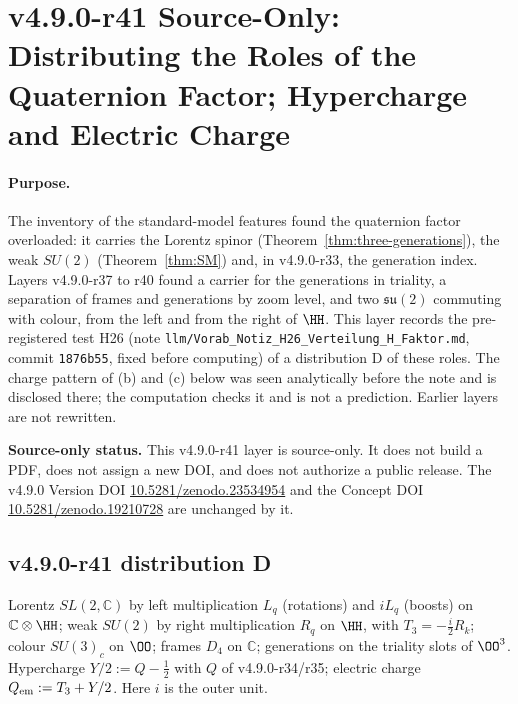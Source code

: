 \clearpage
\section*{v4.9.0-r41 Source-Only: Distributing the Roles of the Quaternion Factor; Hypercharge and Electric Charge}
\label{sec:v490-r41-quaternion-roles}

\paragraph{Purpose.}
The inventory of the standard-model features found the quaternion factor overloaded: it carries the Lorentz spinor
(Theorem~\ref{thm:three-generations}), the weak \(SU(2)\) (Theorem~\ref{thm:SM}) and, in v4.9.0-r33, the generation index.  Layers
v4.9.0-r37 to r40 found a carrier for the generations in triality, a separation of frames and generations by zoom level, and two
\(\mathfrak{su}(2)\) commuting with colour, from the left and from the right of \(\HH\).  This layer records the pre-registered test H26
(note \texttt{llm/Vorab\_Notiz\_H26\_Verteilung\_H\_Faktor.md}, commit \texttt{1876b55}, fixed before computing) of a distribution D of
these roles.  The charge pattern of (b) and (c) below was seen analytically before the note and is disclosed there; the computation
checks it and is not a prediction.  Earlier layers are not rewritten.

\noindent\textbf{Source-only status.}
This v4.9.0-r41 layer is source-only.  It does not build a PDF, does not assign a new DOI,
and does not authorize a public release.  The v4.9.0 Version DOI
\href{https://doi.org/10.5281/zenodo.23534954}{10.5281/zenodo.23534954} and the Concept DOI
\href{https://doi.org/10.5281/zenodo.19210728}{10.5281/zenodo.19210728} are unchanged by it.

\subsection*{v4.9.0-r41 distribution D}
\label{subsec:v490-r41-distribution}

Lorentz \(SL(2,\mathbb C)\) by left multiplication \(L_q\) (rotations) and \(iL_q\) (boosts) on \(\mathbb C\otimes\HH\); weak \(SU(2)\) by
right multiplication \(R_q\) on \(\HH\), with \(T_3=-\tfrac{i}{2}R_k\); colour \(SU(3)_c\) on \(\OO\); frames \(D_4\) on \(\mathbb C\); generations on
the triality slots of \(\OO^3\).  Hypercharge \(Y/2:=Q-\tfrac12\) with \(Q\) of v4.9.0-r34/r35; electric charge \(Q_{\rm em}:=T_3+Y/2\).  Here \(i\)
is the outer unit.

